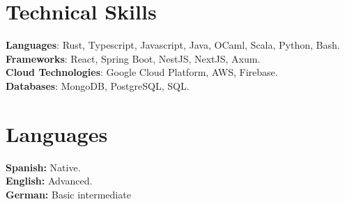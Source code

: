 \documentclass[letterpaper,11pt]{article}
\begin{document}
%
\section{Technical Skills}
 \begin{itemize}[leftmargin=0.15in, label={}]
    \small{\item{
     \textbf{Languages}{: Rust, Typescript, Javascript, Java, OCaml, Scala, Python, Bash.} \\
     \textbf{Frameworks}{: React, Spring Boot, NestJS, NextJS, Axum. } \\
     \textbf{Cloud Technologies}{: Google Cloud Platform, AWS, Firebase. } \\
     \textbf{Databases}{: MongoDB, PostgreSQL, SQL.} \\
    }}
 \end{itemize}

\section{Languages}
 \begin{itemize}[leftmargin=0.15in, label={}]
    \small{\item{
     \textbf{Spanish: }{Native.} \\
     \textbf{English: }{Advanced.} \\
     \textbf{German: }{Basic intermediate} \\
    }}
 \end{itemize}


\end{document}
